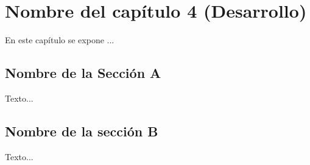 \chapter{Nombre del capítulo 4 (Desarrollo)}
\label{Desarrollo}

\noindent En este capítulo se expone ...

\section{Nombre de la Sección A} \label{EtiquetaDeSeccion41}
\noindent Texto...

\section{Nombre de la sección B} \label{EtiquetaDeSeccion42}
\noindent Texto...

